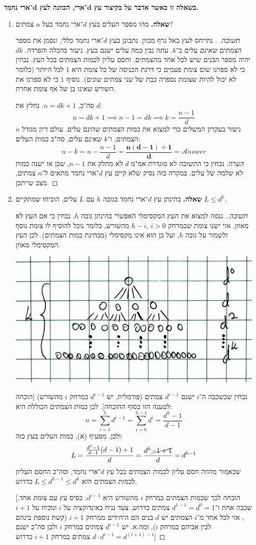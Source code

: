 \documentclass[]{article}
\newcommand\ans   {\mathscr{A}\!\mathit{nswer}}
\theoremstyle{definition}
\begin{document}
	\textbf{בשאלה זו כאשר אדבר על בקיצור עץ $\bm{d}$־ארי, הכוונה לעץ $\bm{d}$־ארי נחמד. }
	\begin{enumerate}
		\item \textbf{שאלה. }מהו מספר העלים בעץ $d$־ארי נחמד בעל $n$ צמתים? \begin{proof}[תשובה. ]נתייחס לעץ כאל גרף מכוון. 
			נתבונן בעץ $d$־ארי נחמד כללי, ונסמן את מספר הצמתים \textit{שאינם} עלים ב־$k$. עתה נבין כמה עלים ישנם בעץ. ניעזר בהכלה והפרדה. $dk$ יהיה מספר הבנים שיש לכל אחד מהצמתים, וחסם עליון לכמות הצמתים בכל העץ. נבחין כי לא ספרנו שום צומת פעמים כי דרגת הכניסה של כל צומת היא $1$ לכל היותר (כלומר לא יכול להיות שצומת נספרה כבת של שני צמתים שונים). נוסיף $1$ כי לא ספרנו את השורש שאינו בן של אף צומת אחרת. 
			
			סה"כ, $n = dk + 1$. נחלץ את $d$: 
			\[ n = dk + 1 \implies n - 1 = dk \implies k = \frac{n - 1}{d} \]
			ניעזר בעקרון המשלים כדי למצוא את כמות הצמתים שהינם עלים. עולם דיון מגודל $n$ הצמתים, ו־$k$ שאינם עלים, סה"כ כמות העלים: 
			\[ n - k = n - \frac{n - 1}{d} = \bm{\frac{n(d - 1) + 1}{d}} = \ans \]
			\textit{הערה: }נבחין כי התשובה לא מוגדרת אמ"מ $d$ לא מחלק את $n - 1$, שכן אז ישנה כמות לא שלמה של עלים. במקרה כזה נסיק שלא קיים עץ $d$־ארי נחמד מתאים ל־$n$ צמתים, מצב שייתכן. 
		\end{proof}
		\item \textbf{שאלה. }בהינתן עץ $d$־ארי נחמד בגובה $h$ עם $L$ עלים, הוכיחו שמתקיים $L \le d^h$.
		\begin{proof}[תשובה.]ננסה למצוא את העץ המקסימלי האפשרי בהינתן גובה $h$. נבחין כי אם העץ לא מאוזן, אזי ישנו צומת שבמרחק $h - i, \ i > 0$ מהשורש, כלומר נוכל להוסיף לו צומת נוסף ולשמור על גובה $h$, ועל כן הוא אינו מקסימלי (מבחינת כמות הצמתים). לכן העץ המקסימלי מאוזן. 
			\begin{center}
				\includegraphics[width=0.35\linewidth]{images/something}
			\end{center}
			נבחין שבשכבה ה־$i$ ישנם $d^{i - 1}$ צמתים (פורמלית, יש $d^{i - 1}$ במרחק $i$ מהשורש) [הוכחה לטענה הזו בסוף ההוכחה]. לכן כמות הצמתים הכוללת היא: 
			\[ n = \sum_{i = 1}^{h}d^{i - 1} = \sum_{i = 0}^{h - 1}d^{i} = \frac{d^{h} - 1}{d - 1} \]
			ולכן, מסעיף (א), כמות העלים בעץ כזה: 
			\[ L = \frac{\frac{d^{h} - 1}{d - 1}(d - 1) + 1}{d} = \frac{d^{h} \cancel{ - 1 + 1}}{d} = d^{h - 1} \]
			שכאמור מהווה חסם עליון לכמות הצמתים בכל עץ $d$־ארי נחמד, וסה"כ החסם העליון לכמות הצמתים הוא $L \le d^{h - 1} \le d^h$ כדרוש. 
			
			[הוכחה לכך שכמות הצמתים במרחק $i$ מהשורש היא $d^{i - 1}$: בסיס עץ עם צומת אחד, שכבה אחת ו־$d^{1 - 1} = d^0 = 1$ צמתים כדרוש, צעד נניח באינדוקציה על $i$ ונוכיח על $i + 1$, אזי לכל אחד מ־$i$ הצמתים יש $d$ בנים הם היחידים ממרחק $i + 1$ (קשת נוספת בינהם לבין אביהם במרחק $i$), ומה.א. יש $d^{i - 1}$ צמתים במרחק $i$ ולכן סה"כ ישנם $d \cdot d^{i - 1} = d^{(i + 1) - 1}$ צמתים במרחק $i + 1$ כדרוש]
		\end{proof}
			
	\end{enumerate}
	
\end{document}
